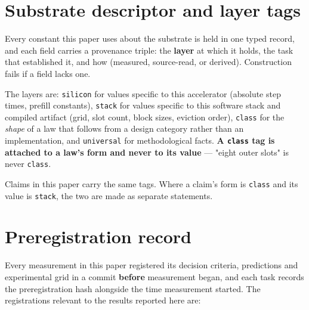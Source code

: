 


\section{Substrate descriptor and layer tags}

Every constant this paper uses about the substrate is held in one typed record, and each field carries a provenance triple: the \textbf{layer} at which it holds, the task that established it, and how (measured, source-read, or derived). Construction fails if a field lacks one.

The layers are: \texttt{silicon} for values specific to this accelerator (absolute step times, prefill constants), \texttt{stack} for values specific to this software stack and compiled artifact (grid, slot count, block sizes, eviction order), \texttt{class} for the \emph{shape} of a law that follows from a design category rather than an implementation, and \texttt{universal} for methodological facts. \textbf{A \texttt{class} tag is attached to a law's form and never to its value} --- "eight outer slots" is never \texttt{class}.

Claims in this paper carry the same tags. Where a claim's form is \texttt{class} and its value is \texttt{stack}, the two are made as separate statements.

\section{Preregistration record}

Every measurement in this paper registered its decision criteria, predictions and experimental grid in a commit \textbf{before} measurement began, and each task records the preregistration hash alongside the time measurement started. The registrations relevant to the results reported here are:


